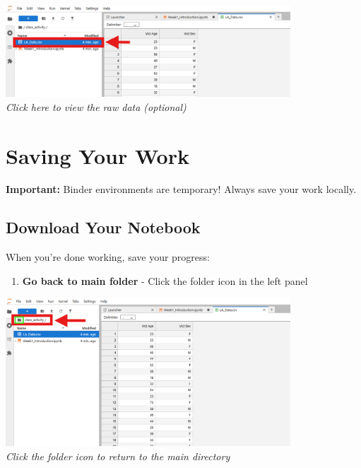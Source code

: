 \documentclass[11pt,a4paper]{article}
\begin{document}
\begin{center}
\includegraphics[width=0.8\textwidth]{../Image_5.png}\\
\textit{Click here to view the raw data (optional)}
\end{center}

\section{Saving Your Work}

\begin{warningbox}
\textbf{Important:} Binder environments are temporary! Always save your work locally.
\end{warningbox}

\subsection{Download Your Notebook}

When you're done working, save your progress:

\begin{enumerate}
    \item \textbf{Go back to main folder} - Click the folder icon in the left panel
\end{enumerate}

\begin{center}
\includegraphics[width=0.8\textwidth]{../Image_6.png}\\
\textit{Click the folder icon to return to the main directory}
\end{center}
\end{document}
